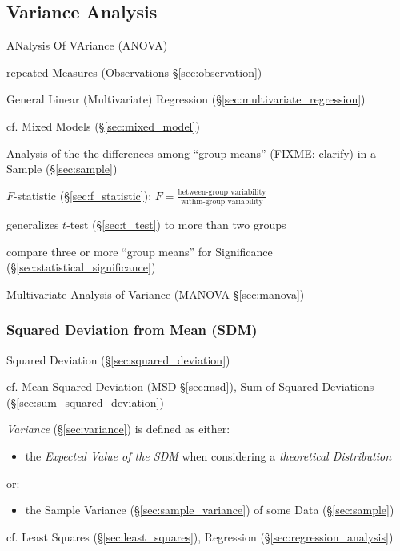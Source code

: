 \subsection{Variance Analysis}\label{sec:variance_analysis}

ANalysis Of VAriance (ANOVA)

repeated Measures (Observations \S\ref{sec:observation})

General Linear (Multivariate) Regression (\S\ref{sec:multivariate_regression})

cf. Mixed Models (\S\ref{sec:mixed_model})

Analysis of the the differences among ``group means'' (FIXME: clarify) in a
Sample (\S\ref{sec:sample})

$F$-statistic (\S\ref{sec:f_statistic}):
$F = \frac{\text{between-group variability}}{\text{within-group variability}}$

generalizes $t$-test (\S\ref{sec:t_test}) to more than two groups

compare three or more ``group means'' for Significance
(\S\ref{sec:statistical_significance})

\fist Multivariate Analysis of Variance (MANOVA \S\ref{sec:manova})



\subsubsection{Squared Deviation from Mean (SDM)}\label{sec:sdm}

\fist Squared Deviation (\S\ref{sec:squared_deviation})

cf. Mean Squared Deviation (MSD \S\ref{sec:msd}), Sum of Squared
Deviations (\S\ref{sec:sum_squared_deviation})

\emph{Variance} (\S\ref{sec:variance}) is defined as either:
\begin{itemize}
  \item the \emph{Expected Value of the SDM} when considering a
    \emph{theoretical Distribution}
\end{itemize}
or:
\begin{itemize}
  \item the Sample Variance (\S\ref{sec:sample_variance}) of some Data
    (\S\ref{sec:sample})
\end{itemize}

cf. Least Squares (\S\ref{sec:least_squares}), Regression
(\S\ref{sec:regression_analysis})



